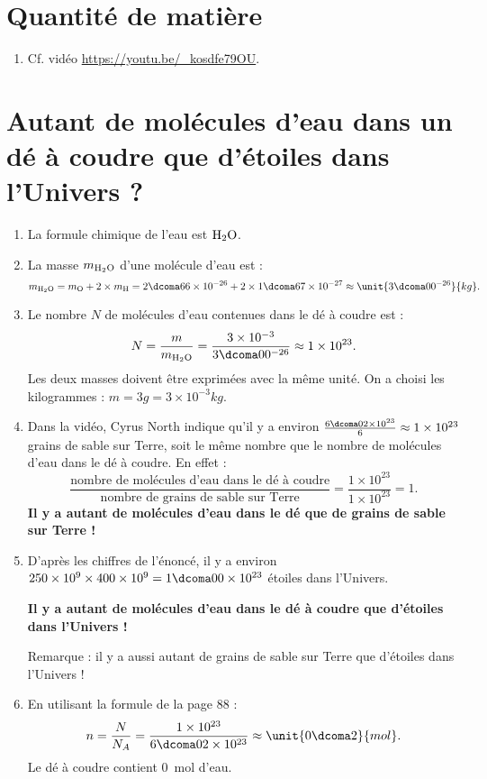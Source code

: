 \documentclass[12pt,a4paper,fleqn]{article}
\begin{document}
\section*{Quantité de matière}

\begin{enumerate}[resume]
\item Cf. vidéo \href{https://youtu.be/\_kosdfe79OU}{https://youtu.be/\_kosdfe79OU}.
\end{enumerate}

\section*{Autant de molécules d'eau dans un dé à coudre que d'étoiles dans l'Univers ?}

\begin{enumerate}[resume]
\item La formule chimique de l'eau est $\text{H}_\text{2}\text{O}$.

\item La masse $m_\mathrm{\text{H}_\text{2}\text{O}}$ d'une molécule d'eau est :
\[
m_{\eau} = m_\mathrm{O} + 2 \times m_\mathrm{H} = 2\dcoma66 \times 10^{-26} + 2 \times 1\dcoma67 \times 10^{-27}  \approx \unit{3\dcoma00 \time 10^{-26}}{kg}.
\]

\item Le nombre $N$ de molécules d'eau contenues dans le dé à coudre est :
\[
N = \frac{m}{m_{\eau}} = \frac{3 \times 10^{-3}}{3\dcoma00 \time 10^{-26}} \approx 1 \times 10^{23}.
\]
\warning{} Les deux masses doivent être exprimées avec la même unité.
On a choisi les kilogrammes : $m = \unit{3}{g} = \unit{3 \times 10^{-3}}{kg}$.

\item Dans la vidéo, Cyrus North indique qu'il y a environ $\frac{6\dcoma02 \times 10^{23}}{6} \approx 1 \times 10^{23}$ grains de sable sur Terre, soit le même nombre que le nombre de molécules d'eau dans le dé à coudre.
En effet :
\[
\frac{\text{nombre de molécules d'eau dans le dé à coudre}}{\text{nombre de grains de sable sur Terre}} = \frac{1 \times 10^{23}}{1 \times 10^{23}} = 1.
\]
\textbf{Il y a autant de molécules d'eau dans le dé que de grains de sable sur Terre !}

\item D'après les chiffres de l'énoncé, il y a environ $250 \times 10^9 \times 400 \times 10^9 = 1\dcoma00 \times 10^{23}$ étoiles dans l'Univers.

\textbf{Il y a autant de molécules d'eau dans le dé à coudre que d'étoiles dans l'Univers !}

Remarque : il y a aussi autant de grains de sable sur Terre que d'étoiles dans l'Univers !

\item En utilisant la formule de la page 88 :
\[
n = \frac{N}{N_A} = \frac{1 \times 10^{23}}{6\dcoma02 \times 10^{23}} \approx \unit{0\dcoma2}{mol}.
\]
Le dé à coudre contient \unit{0}{mol} d'eau.

\end{enumerate}
\end{document}
